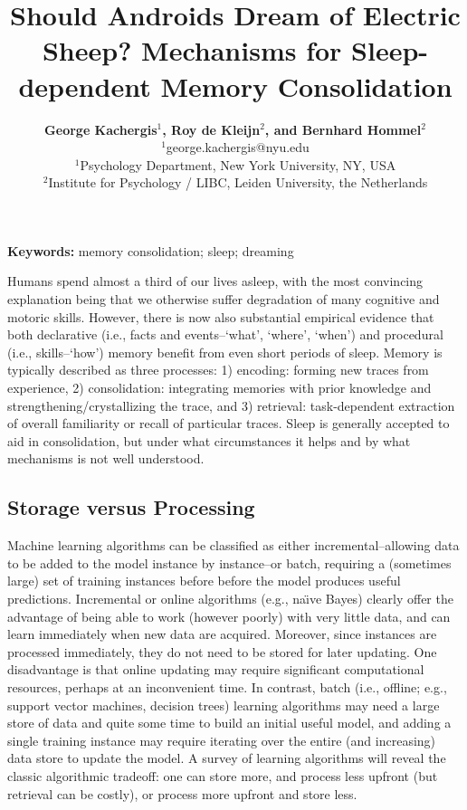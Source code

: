 \documentclass[10pt,letterpaper]{article}
\title{Should Androids Dream of Electric Sheep? Mechanisms for Sleep-dependent Memory Consolidation}
\author{{\large \bf George Kachergis$^{1}$, Roy de Kleijn$^{2}$, and Bernhard Hommel$^{2}$} \\
  $^{1}$george.kachergis@nyu.edu \\
  $^{1}$Psychology Department, New York University, NY, USA \\
  $^{2}$Institute for Psychology / LIBC, Leiden University, the Netherlands 
\vspace{-.4cm}}
\begin{document}
\maketitle


\textbf{Keywords:} 
memory consolidation; sleep; dreaming


Humans spend almost a third of our lives asleep, with the most convincing explanation being that we otherwise suffer degradation of many cognitive and motoric skills. However, there is now also substantial empirical evidence that both declarative (i.e., facts and events--`what', `where', `when') and procedural (i.e., skills--`how') memory benefit from even short periods of sleep. Memory is typically described as three processes: 1) encoding: forming new traces from experience, 2) consolidation: integrating memories with prior knowledge and strengthening/crystallizing the trace, and 3) retrieval: task-dependent extraction of overall familiarity or recall of particular traces. Sleep is generally accepted to aid in consolidation, but under what circumstances it helps and by what mechanisms is not well understood. 
\vspace{-.2cm}
\subsection{Storage versus Processing}
\vspace{-.2cm}

Machine learning algorithms can be classified as either incremental--allowing data to be added to the model instance by instance--or batch, requiring a (sometimes large) set of training instances before before the model produces useful predictions. Incremental or online algorithms (e.g., na\"{\i}ve Bayes) clearly offer the advantage of being able to work (however poorly) with very little data, and can learn immediately when new data are acquired. Moreover, since instances are processed immediately, they do not need to be stored for later updating. One disadvantage is that online updating may require significant computational resources, perhaps at an inconvenient time. In contrast, batch (i.e., offline; e.g., support vector machines, decision trees) learning algorithms may need a large store of data and quite some time to build an initial useful model, and adding a single training instance may require iterating over the entire (and increasing) data store to update the model. A survey of learning algorithms will reveal the classic algorithmic tradeoff: one can store more, and process less upfront (but retrieval can be costly), or process more upfront and store less.
\end{document}
